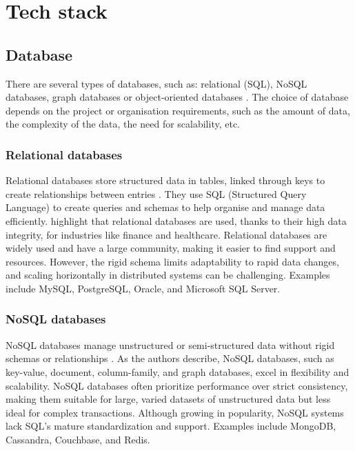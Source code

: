 \section{Tech stack}

\subsection{Database}

There are several types of databases, such as: relational (SQL), NoSQL databases, graph databases or object-oriented databases \parencite{databases2}. The choice of database depends on the project or organisation requirements, such as the amount of data, the complexity of the data, the need for scalability, etc. 

\subsubsection{Relational databases}

Relational databases store structured data in tables, linked through keys to create relationships between entries \parencite{databases}. They use SQL (Structured Query Language) to create queries and schemas to help organise and manage data efficiently. \textcite{databases} highlight that relational databases are used, thanks to their high data integrity, for industries like finance and healthcare. Relational databases are widely used and have a large community, making it easier to find support and resources. However, the rigid schema limits adaptability to rapid data changes, and scaling horizontally in distributed systems can be challenging. Examples include MySQL, PostgreSQL, Oracle, and Microsoft SQL Server.

\subsubsection{NoSQL databases}

NoSQL databases manage unstructured or semi-structured data without rigid schemas or relationships \parencite{databases}. As the authors describe, NoSQL databases, such as key-value, document, column-family, and graph databases, excel in flexibility and scalability. NoSQL databases often prioritize performance over strict consistency, making them suitable for large, varied datasets of unstructured data but less ideal for complex transactions. Although growing in popularity, NoSQL systems lack SQL’s mature standardization and support. Examples include MongoDB, Cassandra, Couchbase, and Redis.

